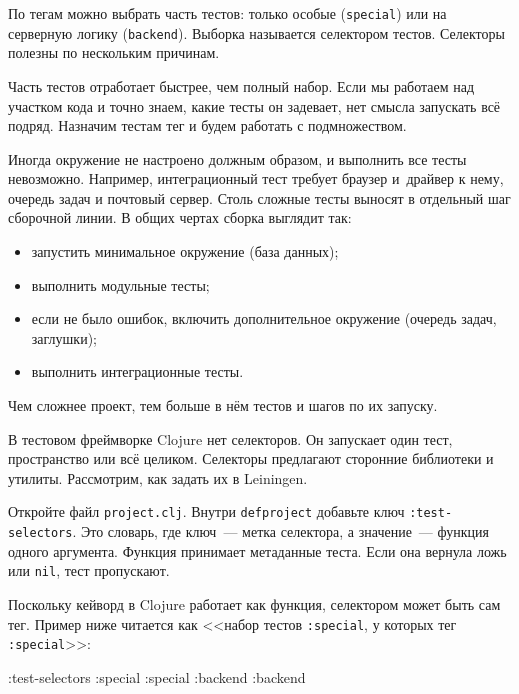 \fi

По тегам можно выбрать часть тестов: только особые (\verb|special|) или на
серверную логику (\verb|backend|). Выборка называется селектором
тестов. Селекторы полезны по нескольким причинам.

Часть тестов отработает быстрее, чем полный набор. Если мы работаем над участком
кода и точно знаем, какие тесты он задевает, нет смысла запускать всё
подряд. Назначим тестам тег и будем работать с подмножеством.

Иногда окружение не настроено должным образом, и выполнить все тесты
невозможно. Например, интеграционный тест требует браузер и~драйвер к нему,
очередь задач и почтовый сервер. Столь сложные тесты выносят в отдельный шаг
сборочной линии. В общих чертах сборка выглядит так:

\begin{itemize}

\item
  запустить минимальное окружение (база данных);

\item
  выполнить модульные тесты;

\item
  если не было ошибок, включить дополнительное окружение (очередь задач,
  заглушки);

\item
  выполнить интеграционные тесты.

\end{itemize}

\noindent
Чем сложнее проект, тем больше в нём тестов и шагов по их запуску.

В тестовом фреймворке Clojure нет селекторов. Он запускает один тест,
пространство или всё целиком. Селекторы предлагают сторонние библиотеки и
утилиты. Рассмотрим, как задать их в Leiningen.

Откройте файл \verb|project.clj|. Внутри \texttt{def\-pro\-ject} добавьте ключ
\verb|:test-selectors|. Это словарь, где ключ~--- метка селектора, а
значение~--- функция одного аргумента. Функция принимает метаданные теста. Если
она вернула ложь или \verb|nil|, тест пропускают.

Поскольку кейворд в Clojure работает как функция, селектором может быть сам
тег. Пример ниже читается как <<набор тестов \verb|:special|, у которых тег
\verb|:special|>>:

\begin{english}
  \begin{clojure}
:test-selectors {:special :special
                 :backend :backend}
  \end{clojure}
\end{english}

